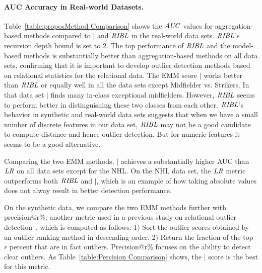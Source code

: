 {	\paragraph{AUC Accuracy in Real-world Datasets.}
Table~\ref{table:proposMethod Comparison} shows the $\it{AUC}$ values
 for aggregation-based methods compared to $\mid$ and $\it{RIBL}$ in the real-world data sets.  $\it{RIBL}$'s recursion depth bound is set to 2. The top performance of $\it{RIBL}$ and the model-based methods is substantially better than aggregation-based methods on all data sets,  confirming that it is important to develop outlier detection methods based on relational statistics for the relational data. The  EMM score $\mid$ works better than $\it{RIBL}$ or equally well in all the data sets except Midfielder vs. Strikers. In that data set $\mid$ finds many in-class exceptional midfielders. However, $\it{RIBL}$ seems to perform better in distinguishing these two classes from each other. $\it{RIBL}$'s behavior in synthetic and real-world data sets suggests that when we have a small number of discrete features in our data set, $\it{RIBL}$ may not be a good candidate to compute distance and hence outlier detection. But for numeric features it seems to be a good alternative.

Comparing the two EMM methods,  $\mid$ achieves a substantially higher AUC than $\it{LR}$ on all data sets except for the NHL. On the NHL data set, the $\it{LR}$ metric outperforms both $\it{RIBL}$ and $\mid$, which is an example of how taking absolute values does not alway result in better detection performance.   

On the synthetic data, we compare the two EMM methods further  with precision@r\%, another metric used in a previous study on relational outlier detection~\citep{Gao2010}, which is computed as follows: 1) Sort the outlier scores obtained by an outlier ranking method in descending order. 2) Return the fraction of the top $r$ percent that are in fact outliers. Precision@r\% focuses on the ability to detect clear outliers. As Table~\ref{table:Percision Comparison} shows, the $\mid$ score is the best for this metric.

	\begin{table}
		\begin{subtable}
			
			\centering
\end{subtable}
\end{table}}
